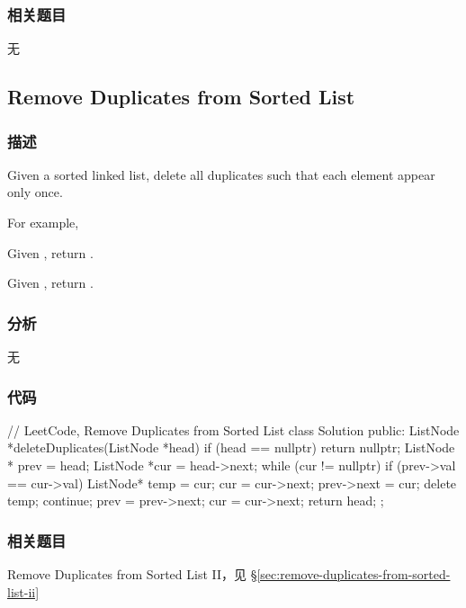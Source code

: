 \subsubsection{相关题目}

\begindot
\item 无
\myenddot


\subsection{Remove Duplicates from Sorted List}
\label{sec:remove-duplicates-from-sorted-list}


\subsubsection{描述}
Given a sorted linked list, delete all duplicates such that each element appear only once.

For example,

Given , return .

Given , return .


\subsubsection{分析}
无


\subsubsection{代码}
\begin{Code}
// LeetCode, Remove Duplicates from Sorted List
class Solution {
public:
    ListNode *deleteDuplicates(ListNode *head) {
        if (head == nullptr) return nullptr;
        ListNode * prev = head;
        ListNode *cur = head->next;
        while (cur != nullptr) {
            if (prev->val == cur->val) {
                ListNode* temp = cur;
                cur = cur->next;
                prev->next = cur;
                delete temp;
                continue;
            }
            prev = prev->next;
            cur = cur->next;
        }
        return head;
    }
};
\end{Code}


\subsubsection{相关题目}

\begindot
\item Remove Duplicates from Sorted List II，见 \S \ref{sec:remove-duplicates-from-sorted-list-ii}
\myenddot


